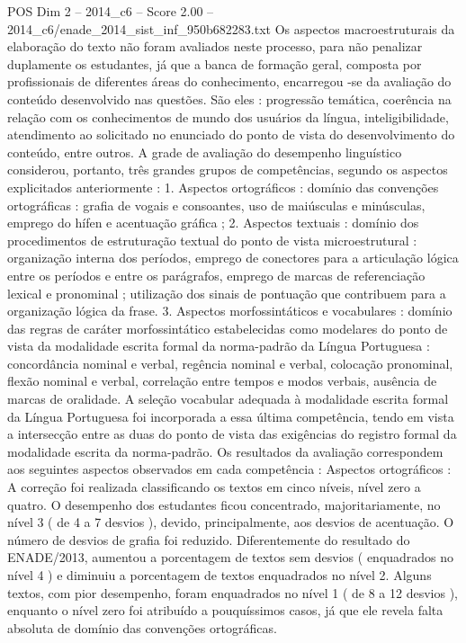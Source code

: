 \begin{textsample}{POS Dim 2 – 2014\_c6 – Score 2.00 – 2014\_c6/enade\_2014\_sist\_inf\_950b682283.txt}
Os aspectos macroestruturais da elaboração do texto não foram avaliados neste processo, para não penalizar duplamente os estudantes, já que a banca de formação geral, composta por profissionais de diferentes áreas do conhecimento, encarregou -se da avaliação do conteúdo desenvolvido nas questões.
São eles : progressão temática, coerência na relação com os conhecimentos de mundo dos usuários da língua, inteligibilidade, atendimento ao solicitado no enunciado do ponto de vista do desenvolvimento do conteúdo, entre outros.
A grade de avaliação do desempenho linguístico considerou, portanto, três grandes grupos de competências, segundo os aspectos explicitados anteriormente : 1.
Aspectos ortográficos : domínio das convenções ortográficas : grafia de vogais e consoantes, uso de maiúsculas e minúsculas, emprego do hífen e acentuação gráfica ; 2.
Aspectos textuais : domínio dos procedimentos de estruturação textual do ponto de vista microestrutural : organização interna dos períodos, emprego de conectores para a articulação lógica entre os períodos e entre os parágrafos, emprego de marcas de referenciação lexical e pronominal ; utilização dos sinais de pontuação que contribuem para a organização lógica da frase. 3.
Aspectos morfossintáticos e vocabulares : domínio das regras de caráter morfossintático estabelecidas como modelares do ponto de vista da modalidade escrita formal da norma-padrão da Língua Portuguesa : concordância nominal e verbal, regência nominal e verbal, colocação pronominal, flexão nominal e verbal, correlação entre tempos e modos verbais, ausência de marcas de oralidade.
A seleção vocabular adequada à modalidade escrita formal da Língua Portuguesa foi incorporada a essa última competência, tendo em vista a intersecção entre as duas do ponto de vista das exigências do registro formal da modalidade escrita da norma-padrão.
Os resultados da avaliação correspondem aos seguintes aspectos observados em cada competência : Aspectos ortográficos : A correção foi realizada classificando os textos em cinco níveis, nível zero a quatro.
O desempenho dos estudantes ficou concentrado, majoritariamente, no nível 3 ( de 4 a 7 desvios ), devido, principalmente, aos desvios de acentuação.
O número de desvios de grafia foi reduzido.
Diferentemente do resultado do ENADE/2013, aumentou a porcentagem de textos sem desvios ( enquadrados no nível 4 ) e diminuiu a porcentagem de textos enquadrados no nível 2.
Alguns textos, com pior desempenho, foram enquadrados no nível 1 ( de 8 a 12 desvios ), enquanto o nível zero foi atribuído a pouquíssimos casos, já que ele revela falta absoluta de domínio das convenções ortográficas.

\end{textsample}
